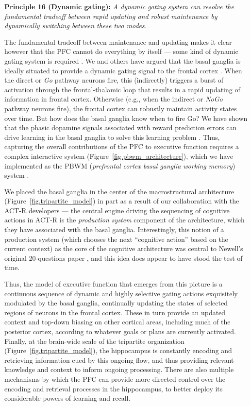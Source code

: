 \documentclass[11pt,twoside]{article}
\begin{document}
{\bf Principle 16 (Dynamic gating):} {\em A dynamic gating system can resolve
  the fundamental tradeoff between rapid updating and robust maintenance by
  dynamically switching between these two modes.}  

The fundamental tradeoff between maintenance and updating makes it clear
however that the PFC cannot do everything by itself --- some kind of dynamic
gating system is required \cite{OReillyBraverCohen99}.  We and others have
argued that the basal ganglia is ideally situated to provide a dynamic gating
signal to the frontal cortex \cite[e.g., ]{FrankLoughryOReilly01}.  When the
direct or {\em Go} pathway neurons fire, this (indirectly) triggers a burst of
activation through the frontal-thalamic loop that results in a rapid updating
of information in frontal cortex.  Otherwise (e.g., when the indirect or {\em
  NoGo} pathway neurons fire), the frontal cortex can robustly maintain
activity states over time.  But how does the basal ganglia know when to fire
Go?  We have shown that the phasic dopamine signals associated with reward
prediction errors can drive learning in the basal ganglia to solve this
learning problem \cite{OReillyFrank06}.  Thus, capturing the overall
contributions of the PFC to executive function requires a complex interactive
system (Figure~\ref{fig.pbwm_architecture}), which we have implemented as the
PBWM ({\em prefrontal cortex basal ganglia working memory}) system
\cite{OReillyFrank06,HazyFrankOReilly06,HazyFrankOReilly07,HazyPauliHerdEtAlInPrep}.

We placed the basal ganglia in the center of the macrostructural architecture
(Figure~\ref{fig.tripartite_model}) in part as a result of our collaboration
with the ACT-R developers --- the central engine driving the sequencing of
cognitive actions in ACT-R is the {\em production system} component of the
architecture, which they have associated with the basal ganglia.
Interestingly, this notion of a production system (which chooses the next
``cognitive action'' based on the current context) as the core of the
cognitive architecture was central to Newell's original 20-questions paper
\cite{Newell73}, and this idea does appear to have stood the test of time.
 
Thus, the model of executive function that emerges from this picture is a
continuous sequence of dynamic and highly selective gating actions exquisitely
modulated by the basal ganglia, continually updating the states of selected
regions of neurons in the frontal cortex. These in turn provide an updated
context and top-down biasing on other cortical areas, including much of the
posterior cortex, according to whatever goals or plans are currently
activated.  Finally, at the brain-wide scale of the tripartite organization
(Figure~\ref{fig.tripartite_model}), the hippocampus is constantly encoding
and retrieving information cued by this ongoing flow, and thus providing
relevant knowledge and context to inform ongoing processing.  There are also
multiple mechanisms by which the PFC can provide more directed control over
the encoding and retrieval processes in the hippocampus, to better deploy its
considerable powers of learning and recall.
\end{document}
